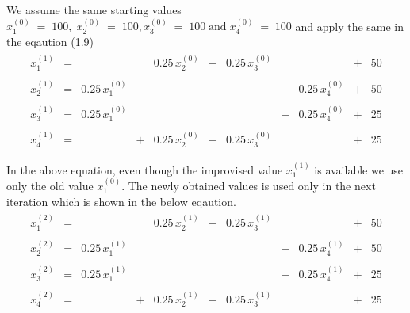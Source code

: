 We assume the same starting values $x_1^{(0)}\;=\;100,\;x_2^{(0)}\;=\;100,x_3^{(0)}\;=\;100\;\mathrm{and}\; x_4^{(0)}\;=\;100$ and apply the same in the eqaution (1.9)
\begin{eqnarray}
\begin{array}{rrrrrrrrrrr}
x_1^{(1)}    &=&             & & 0.25\,x_2^{(0)}   &+& 0.25\,x_3^{(0)}   &&              &+& 50 \\ \\

x_2^{(1)}    &=& 0.25\,x_1^{(0)}   & &             & &             &+& 0.25\,x_4^{(0)}   &+& 50 \\ \\

x_3^{(1)}    &=& 0.25\,x_1^{(0)}   & &             & &             &+& 0.25\,x_4^{(0)}   &+& 25 \\ \\             

x_4^{(1)}    &=& 	     &+& 0.25\,x_2^{(0)}   &+& 0.25\,x_3^{(0)}   & &             &+& 25 \\ \\ 
\end{array}
\end{eqnarray}
In the above equation, even though the improvised value $x_1^{(1)}$ is available we use only the old value $x_1^{(0)}$. The newly obtained values is used only in the next iteration which is shown in the below eqaution.
\begin{eqnarray}
\begin{array}{rrrrrrrrrrr}
x_1^{(2)}    &=&             & & 0.25\,x_2^{(1)}   &+& 0.25\,x_3^{(1)}   &&              &+& 50 \\ \\

x_2^{(2)}    &=& 0.25\,x_1^{(1)}   & &             & &             &+& 0.25\,x_4^{(1)}   &+& 50 \\ \\

x_3^{(2)}    &=& 0.25\,x_1^{(1)}   & &             & &             &+& 0.25\,x_4^{(1)}   &+& 25 \\ \\             

x_4^{(2)}    &=& 	     &+& 0.25\,x_2^{(1)}   &+& 0.25\,x_3^{(1)}   & &             &+& 25 \\ \\ 
\end{array}
\end{eqnarray}

